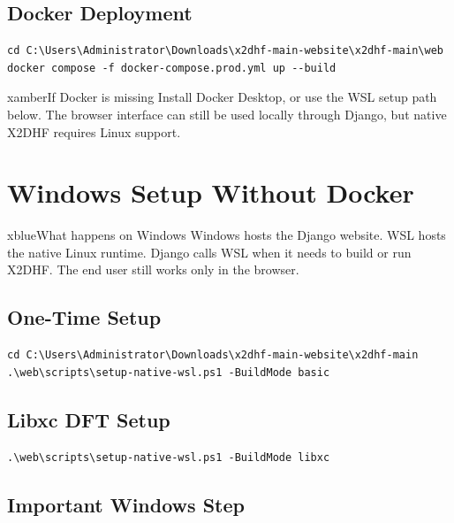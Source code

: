 \documentclass[11pt,a4paper]{article}
\begin{document}
\subsection{Docker Deployment}

\begin{lstlisting}[style=xcmd]
cd C:\Users\Administrator\Downloads\x2dhf-main-website\x2dhf-main\web
docker compose -f docker-compose.prod.yml up --build
\end{lstlisting}

\begin{xbox}{xamber}{If Docker is missing}
Install Docker Desktop, or use the WSL setup path below. The browser interface can still be used locally through Django, but native X2DHF requires Linux support.
\end{xbox}

\section{Windows Setup Without Docker}

\begin{xbox}{xblue}{What happens on Windows}
Windows hosts the Django website. WSL hosts the native Linux runtime. Django calls WSL when it needs to build or run X2DHF. The end user still works only in the browser.
\end{xbox}

\subsection{One-Time Setup}

\begin{lstlisting}[style=xcmd]
cd C:\Users\Administrator\Downloads\x2dhf-main-website\x2dhf-main
.\web\scripts\setup-native-wsl.ps1 -BuildMode basic
\end{lstlisting}

\subsection{Libxc DFT Setup}

\begin{lstlisting}[style=xcmd]
.\web\scripts\setup-native-wsl.ps1 -BuildMode libxc
\end{lstlisting}

\subsection{Important Windows Step}
\end{document}
